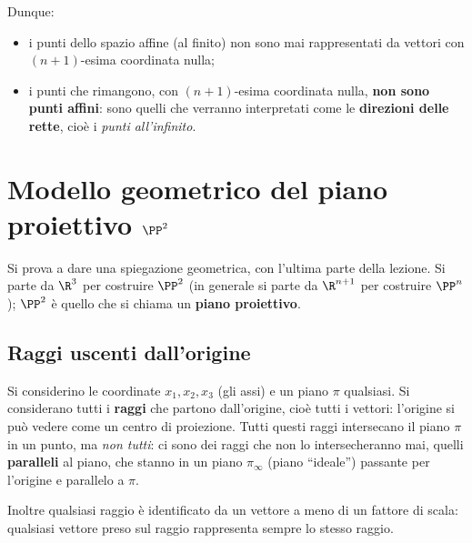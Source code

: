Dunque:
\begin{itemize}
  \item i punti dello spazio affine (al finito) non sono mai rappresentati da vettori con $(n+1)$-esima coordinata nulla;
  \item i punti che rimangono, con $(n+1)$-esima coordinata nulla, \textbf{non sono punti affini}: sono quelli che verranno interpretati come le \textbf{direzioni delle rette}, cioè i \emph{punti all'infinito}.
\end{itemize}

\section{Modello geometrico del piano proiettivo $\PP^2$}

Si prova a dare una spiegazione geometrica, con l'ultima parte della lezione. Si parte da $\R^3$ per costruire $\PP^2$ (in generale si parte da $\R^{n+1}$ per costruire $\PP^n$); $\PP^2$ è quello che si chiama un \textbf{piano proiettivo}.

\subsection{Raggi uscenti dall'origine}

Si considerino le coordinate $x_1,x_2,x_3$ (gli assi) e un piano $\pi$ qualsiasi. Si considerano tutti i \textbf{raggi} che partono dall'origine, cioè tutti i vettori: l'origine si può vedere come un centro di proiezione. Tutti questi raggi intersecano il piano $\pi$ in un punto, ma \emph{non tutti}: ci sono dei raggi che non lo intersecheranno mai, quelli \textbf{paralleli} al piano, che stanno in un piano $\pi_\infty$ (piano ``ideale'') passante per l'origine e parallelo a $\pi$.

Inoltre qualsiasi raggio è identificato da un vettore a meno di un fattore di scala: qualsiasi vettore preso sul raggio rappresenta sempre lo stesso raggio.

\begin{center}
\end{center}

